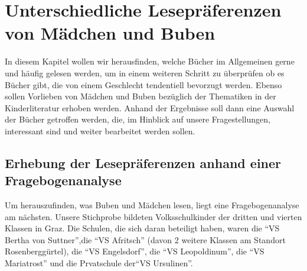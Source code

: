 \chapter{Unterschiedliche Lesepräferenzen von Mädchen und Buben}

In diesem Kapitel wollen wir herausfinden, welche Bücher im Allgemeinen
gerne und häufig gelesen werden, um in einem weiteren Schritt zu
überprüfen ob es Bücher gibt, die von einem Geschlecht tendentiell
bevorzugt werden. Ebenso sollen Vorlieben von Mädchen und Buben
bezüglich der Thematiken in der Kinderliteratur erhoben werden. Anhand
der Ergebnisse soll dann eine Auswahl der Bücher getroffen werden, die,
im Hinblick auf unsere Fragestellungen, interessant sind und weiter
bearbeitet werden sollen.

\section{Erhebung der Lesepräferenzen anhand einer Fragebogenanalyse}

Um herauszufinden, was Buben und Mädchen lesen, liegt eine
Fragebogenanalyse am nächsten. Unsere Stichprobe bildeten
Volksschulkinder der dritten und vierten Klassen in Graz. Die Schulen,
die sich daran beteiligt haben, waren die ``VS Bertha von Suttner'',die
``VS Afritsch'' (davon 2 weitere Klassen am Standort Rosenberggürtel),
die ``VS Engelsdorf'', die ``VS Leopoldinum'', die ``VS Mariatrost'' und
die Prvatschule der``VS Ursulinen''.


